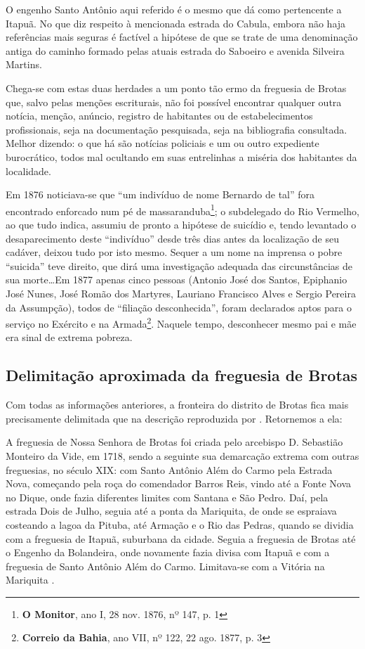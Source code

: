O engenho Santo Antônio aqui referido é o mesmo que  dá como pertencente a Itapuã. No que diz respeito à mencionada estrada do Cabula, embora não haja referências mais seguras é factível a hipótese de que se trate de uma denominação antiga do caminho formado pelas atuais estrada do Saboeiro e avenida Silveira Martins.

Chega-se com estas duas herdades a um ponto tão ermo da freguesia de Brotas que, salvo pelas menções escriturais, não foi possível encontrar qualquer outra notícia, menção, anúncio, registro de habitantes ou de estabelecimentos profissionais, seja na documentação pesquisada, seja na bibliografia consultada. Melhor dizendo: o que há são notícias policiais e um ou outro expediente burocrático, todos mal ocultando em suas entrelinhas a miséria dos habitantes da localidade.

Em 1876 noticiava-se que ``um indivíduo de nome Bernardo de tal'' fora encontrado enforcado num pé de massaranduba\footnote{\textbf{O Monitor}, ano I, 28 nov. 1876, nº 147, p. 1}; o subdelegado do Rio Vermelho, ao que tudo indica, assumiu de pronto a hipótese de suicídio e, tendo levantado o desaparecimento deste ``indivíduo'' desde três dias antes da localização de seu cadáver, deixou tudo por isto mesmo. Sequer a um nome na imprensa o pobre ``suicida'' teve direito, que dirá uma investigação adequada das circunstâncias de sua morte\dots Em 1877 apenas cinco pessoas (Antonio José dos Santos, Epiphanio José Nunes, José Romão dos Martyres, Lauriano Francisco Alves e Sergio Pereira da Assumpção), todos de ``filiação desconhecida'', foram declarados aptos para o serviço no Exército e na Armada\footnote{\textbf{Correio da Bahia}, ano VII, nº 122, 22 ago. 1877, p. 3}. Naquele tempo, desconhecer mesmo pai e mãe era sinal de extrema pobreza.

\subsection{Delimitação aproximada da freguesia de Brotas}

Com todas as informações anteriores, a fronteira do distrito de Brotas fica mais precisamente delimitada que na descrição reproduzida por . Retornemos a ela:

\begin{citacao}
A freguesia de Nossa Senhora de Brotas foi criada pelo arcebispo D. Sebastião Monteiro da Vide, em 1718, sendo a seguinte sua demarcação extrema com outras freguesias, no século XIX: com Santo Antônio Além do Carmo pela Estrada Nova, começando pela roça do comendador Barros Reis, vindo até a Fonte Nova no Dique, onde fazia diferentes limites com Santana e São Pedro. Daí, pela estrada Dois de Julho, seguia até a ponta da Mariquita, de onde se espraiava costeando a lagoa da Pituba, até Armação e o Rio das Pedras, quando se dividia com a freguesia de Itapuã, suburbana da cidade. Seguia a freguesia de Brotas até o Engenho da Bolandeira, onde novamente fazia divisa com Itapuã e com a freguesia de Santo Antônio Além do Carmo. Limitava-se com a Vitória na Mariquita \cite[p.~58]{NASCIMENTO2007}.
\end{citacao}

